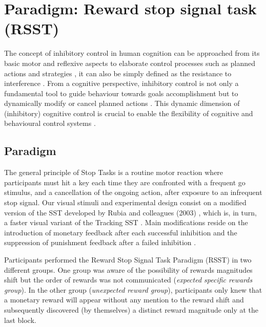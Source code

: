 \chapter{Paradigm: Reward stop signal task (RSST)}\label{appendix:rsst}

The concept of inhibitory control in human cognition can be approached from its basic motor and reflexive aspects to elaborate control processes such as planned actions and strategies \cite{aron2003stop}, it can also be simply defined as the resistance to interference \cite{dempster1992rise}. From a cognitive perspective, inhibitory control is not only a fundamental tool to guide behaviour towards goals accomplishment but to dynamically modify or cancel planned actions \cite{bari2013inhibition}. This dynamic dimension of (inhibitory) cognitive control is crucial to enable the flexibility of cognitive and behavioural control systems \cite{ide2013bayesian}.

\section{Paradigm}

The general principle of Stop Tasks is a routine motor reaction where participants must hit a key each time they are confronted with a frequent go stimulus, and a cancellation of the ongoing action, after exposure to an infrequent stop signal. Our visual stimuli and experimental design consist on a modified version of the SST developed by Rubia and colleagues (2003) \cite{rubia2003right}, which is, in turn, a faster visual variant of the Tracking SST \cite{logan1984ability}. Main modifications reside on the introduction of monetary feedback after each successful inhibition and the suppression of punishment feedback after a failed inhibition \cite{herrera2019expectation}.

Participants performed the Reward Stop Signal Task Paradigm (RSST) in two different groups. One group was aware of the possibility of rewards magnitudes shift but the order of rewards was not communicated (\textit{expected specific rewards group}). In the other group (\textit{unexpected reward group}), participants only knew that a monetary reward will appear without any mention to the reward shift and subsequently discovered (by themselves) a distinct reward magnitude only at the last block.


